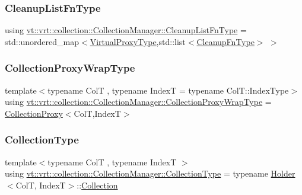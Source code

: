 \subsubsection{\texorpdfstring{Cleanup\+List\+Fn\+Type}{CleanupListFnType}}
{\footnotesize\ttfamily using \hyperlink{structvt_1_1vrt_1_1collection_1_1_collection_manager_a735e54bc5a8646536d07750e2549a156}{vt\+::vrt\+::collection\+::\+Collection\+Manager\+::\+Cleanup\+List\+Fn\+Type} =  std\+::unordered\+\_\+map$<$\hyperlink{namespacevt_a1b417dd5d684f045bb58a0ede70045ac}{Virtual\+Proxy\+Type},std\+::list$<$\hyperlink{structvt_1_1vrt_1_1collection_1_1_collection_manager_a95c122e5b83bc51c306c9367b8e62c07}{Cleanup\+Fn\+Type}$>$ $>$}

\mbox{\label{structvt_1_1vrt_1_1collection_1_1_collection_manager_a56458ed7f9bb22b631b9b3a745f42f94}} 
\subsubsection{\texorpdfstring{Collection\+Proxy\+Wrap\+Type}{CollectionProxyWrapType}}
{\footnotesize\ttfamily template$<$typename ColT , typename IndexT  = typename Col\+T\+::\+Index\+Type$>$ \\
using \hyperlink{structvt_1_1vrt_1_1collection_1_1_collection_manager_a56458ed7f9bb22b631b9b3a745f42f94}{vt\+::vrt\+::collection\+::\+Collection\+Manager\+::\+Collection\+Proxy\+Wrap\+Type} =  \hyperlink{structvt_1_1vrt_1_1collection_1_1_collection_proxy}{Collection\+Proxy}$<$ColT,IndexT$>$}

\mbox{\label{structvt_1_1vrt_1_1collection_1_1_collection_manager_ad20a11229c9e9efe69135c207047bf85}} 
\subsubsection{\texorpdfstring{Collection\+Type}{CollectionType}}
{\footnotesize\ttfamily template$<$typename ColT , typename IndexT $>$ \\
using \hyperlink{structvt_1_1vrt_1_1collection_1_1_collection_manager_ad20a11229c9e9efe69135c207047bf85}{vt\+::vrt\+::collection\+::\+Collection\+Manager\+::\+Collection\+Type} =  typename \hyperlink{structvt_1_1vrt_1_1collection_1_1_holder}{Holder}$<$ColT, IndexT$>$\+::\hyperlink{structvt_1_1vrt_1_1collection_1_1_collection}{Collection}}

